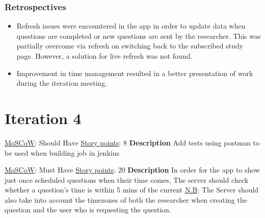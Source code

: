\documentclass[12pt, a4paper]{report}
\begin{document}
\subsubsection{Retrospectives}
\begin{itemize}
    \item Refresh issues were encountered in the app in order to update data when questions are completed or new questions are sent by the researcher. This was partially overcome via refresh on switching back to the subscribed study page. However, a solution for live refresh was not found. 
    \item Improvement in time management resulted in a better presentation of work during the iteration meeting. 
\end{itemize}

\newpage
\section{Iteration 4}
\vspace*{5px}

\begin{tcolorbox}[width=\textwidth,colback={White},title={\textbf {Adding Tests for API}},colbacktitle=grey,coltitle=black]
\underline{MoSCoW}: Should Have
\hfill
\underline {Story points}: 8
\newline
\newline
\blindtext \textbf{Description}
\newline
Add tests using postman to be used when building job in jenkins\newline
\end{tcolorbox}  

\vspace*{20px}

\begin{tcolorbox}[width=\textwidth,colback={White},title={\textbf {Scheduling Just Once}},colbacktitle=grey,coltitle=black]
\underline{MoSCoW}: Must Have
\hfill
\underline {Story points}: 20
\newline
\newline
\blindtext \textbf{Description}
\newline
In order for the app to show just once scheduled questions when their time comes,\newline
The server should check whether a question's time is within 5 mins of the current \newline \newline
\underline{N.B}: The Server should also take into account the timezones of both the researcher when creating the question and the user who is requesting the question.
\end{tcolorbox} 
\end{document}
